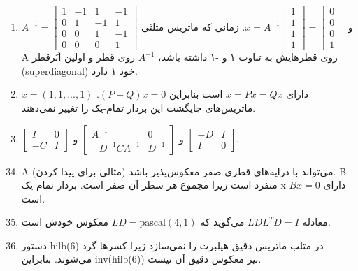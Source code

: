 \documentclass[12pt,a4paper]{article}
\begin{document}
{\begin{enumerate}
			\item $A^{-1} = \begin{bmatrix} 1 & -1 & 1 & -1 \\ 0 & 1 & -1 & 1 \\ 0 & 0 & 1 & -1 \\ 0 & 0 & 0 & 1 \end{bmatrix}$ و $x=A^{-1}\begin{bmatrix} 1\\1\\1\\1 \end{bmatrix} = \begin{bmatrix} 0\\0\\0\\1 \end{bmatrix}$. زمانی که ماتریس مثلثی A روی قطرهایش به تناوب ۱ و -۱ داشته باشد، $A^{-1}$ روی قطر و اولین اَبَرقطر (superdiagonal) خود ۱ دارد.
			
			\item $x=(1,1,...,1)$ دارای $x=Px=Qx$ است بنابراین $(P-Q)x=0$. ماتریس‌های جایگشت این بردار تمام-یک را تغییر نمی‌دهند.
			
			\item $\begin{bmatrix} I & 0 \\ -C & I \end{bmatrix}$ و $\begin{bmatrix} A^{-1} & 0 \\ -D^{-1}CA^{-1} & D^{-1} \end{bmatrix}$ و $\begin{bmatrix} -D & I \\ I & 0 \end{bmatrix}$.
		\end{enumerate}
		
		
		\begin{enumerate}
			\setcounter{enumi}{33}
			\item A می‌تواند با درایه‌های قطری صفر معکوس‌پذیر باشد (مثالی برای پیدا کردن). B منفرد است زیرا مجموع هر سطر آن صفر است. بردار تمام-یک x دارای $Bx=0$ است.
			
			\item معادله $LD L^T D = I$ می‌گوید که $LD = \text{pascal}(4,1)$ معکوس خودش است.
			
			\item دستور hilb(6) در متلب ماتریس دقیق هیلبرت را نمی‌سازد زیرا کسرها گرد می‌شوند. بنابراین inv(hilb(6)) نیز معکوس دقیق آن نیست.
			

\end{enumerate}}
\end{document}
